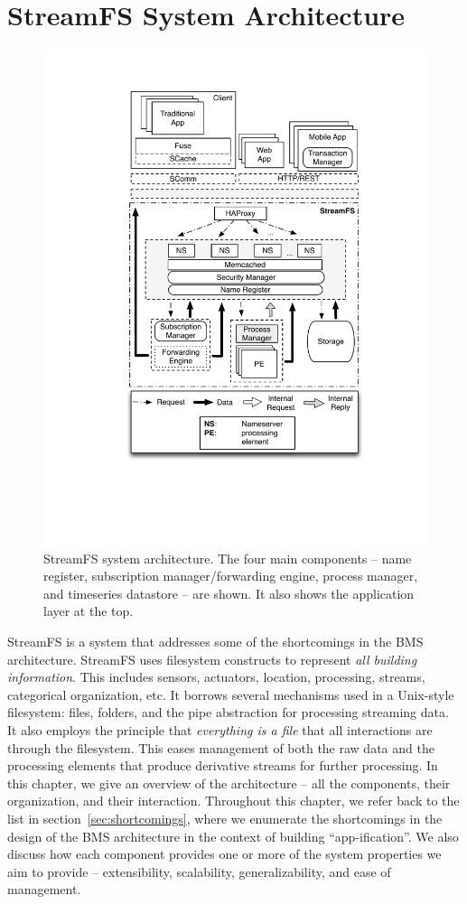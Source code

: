 \chapter{StreamFS System Architecture}
\label{chap:SFSArchMain}



\begin{figure}[th!] %
\centering
\includegraphics[width=0.65\columnwidth]{figs/sfsarch}
\caption{StreamFS system architecture.  The four main components -- name register, subscription manager/forwarding engine, 
process manager, and timeseries datastore -- are shown.  It also shows the application layer at the top.}
\label{fig:sfsarch}
\end{figure}

StreamFS is a system that addresses some of the shortcomings in the BMS architecture.  StreamFS uses filesystem
constructs to represent \emph{all building information}.  This includes sensors, actuators, location, processing, 
streams, categorical organization, etc.  It borrows several mechanisms used in a Unix-style filesystem: files, folders,
and the pipe abstraction for processing streaming data.  It also employs the principle that \emph{everything is a file} 
that all interactions are through the filesystem.
This eases management of both the raw data and the processing elements that produce derivative streams for further processing.
In this chapter, we give an overview of the architecture -- all the components, their organization, and their interaction.
Throughout this chapter, we refer back to the list in section~\ref{sec:shortcomings}, where we enumerate the shortcomings
in the design of the BMS architecture in the context of building ``app-ification''.  We also discuss how each component 
provides one or more of the system properties we aim to provide -- extensibility, scalability, generalizability, and
ease of management.


